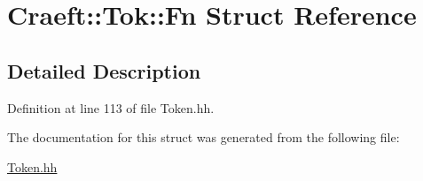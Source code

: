 \hypertarget{struct_craeft_1_1_tok_1_1_fn}{}\section{Craeft\+:\+:Tok\+:\+:Fn Struct Reference}
\label{struct_craeft_1_1_tok_1_1_fn}


\subsection{Detailed Description}


Definition at line 113 of file Token.\+hh.



The documentation for this struct was generated from the following file\+:\begin{DoxyCompactItemize}
\item 
\hyperlink{_token_8hh}{Token.\+hh}\end{DoxyCompactItemize}
